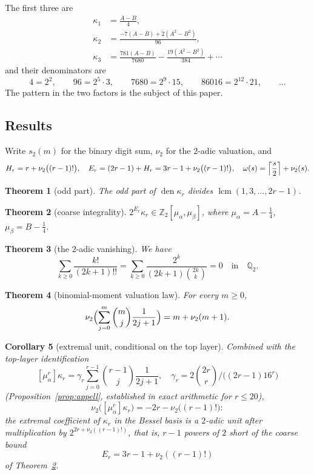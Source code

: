 \documentclass[10pt,a4paper]{amsart}
\newtheorem{theorem}{Theorem}[section]
\newtheorem{corollary}[theorem]{Corollary}
\DeclareMathOperator{\den}{den}
\newcommand{\Zt}{\mathbb Z_2}
\newcommand{\Qt}{\mathbb Q_2}
\newcommand{\ma}{\mu_\alpha}
\newcommand{\mb}{\mu_\beta}
\begin{document}
The first three are
\begin{align*}
  \kappa_1&=\frac{A-B}4,\\
  \kappa_2&=\frac{-7(A-B)+2(A^2-B^2)}{96},\\
  \kappa_3&=\frac{781(A-B)}{7680}-\frac{19(A^2-B^2)}{384}+\cdots
\end{align*}
and their denominators are
\[
  4=2^2,\qquad 96=2^5\!\cdot\!3,\qquad 7680=2^9\!\cdot\!15,\qquad   86016=2^{12}\!\cdot\!21,\qquad\dots
\]
The pattern in the two factors is the subject of this paper.

\subsection{Results}

Write $s_2(m)$ for the binary digit sum, $\nu_2$ for the $2$-adic valuation,
and
\[
  H_r=r+\nu_2\bigl((r-1)!\bigr),\quad
  E_r=(2r-1)+H_r=3r-1+\nu_2\bigl((r-1)!\bigr),\quad
  \omega(s)=\Bigl\lceil\frac s2\Bigr\rceil+\nu_2(s).
\]

\begin{theorem}[odd part]\label{thm:odd}
The odd part of $\den\kappa_r$ divides $\operatorname{lcm}(1,3,\dots,2r-1)$.
\end{theorem}

\begin{theorem}[coarse integrality]\label{thm:coarseintro}
$2^{E_r}\kappa_r\in\Zt[\ma,\mb]$, where $\ma=A-\frac14$, $\mb=B-\frac14$.
\end{theorem}

\begin{theorem}[the $2$-adic vanishing]\label{thm:vanishintro} We have
\[
\displaystyle\sum_{k\ge0}\frac{k!}{(2k+1)!!} =\sum_{k\ge0}\frac{2^k}{(2k+1)\binom{2k}{k}}=0 \quad \text{in} \quad \Qt.
\]
\end{theorem}

\begin{theorem}[binomial-moment valuation law]\label{thm:extremalintro}
For every $m\ge0$,
\[
  \nu_2\Bigl(\sum_{j=0}^{m}\binom mj\frac1{2j+1}\Bigr)=m+\nu_2(m+1).
\]
\end{theorem}

\begin{corollary}[extremal unit, conditional on the top layer]\label{cor:extremalintro}
Combined with the top-layer identification
\[
[\ma^r]\kappa_r=\gamma_r\sum_{j=0}^{r-1}\binom{r-1}j\frac1{2j+1},
 \quad \gamma_r=2\binom{2r}r/\bigl((2r-1)16^r\bigr)
 \]
(Proposition~\ref{prop:appell}, established in exact arithmetic for
$r\le20$),
\[
\nu_2\bigl([\ma^r]\kappa_r\bigr)=-2r-\nu_2\bigl((r-1)!\bigr):
\]
the extremal coefficient of $\kappa_r$ in the Bessel basis is a $2$-adic unit after multiplication by $2^{2r+\nu_2((r-1)!)}$, that is, $r-1$ powers of $2$ short of the coarse bound 
\[
E_r=3r-1+\nu_2((r-1)!)
\]
of Theorem~\ref{thm:coarseintro}.
\end{corollary}
\end{document}
